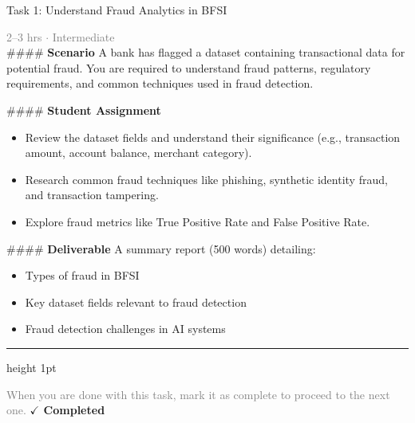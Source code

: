 \documentclass[10pt,a4paper]{article}
\begin{document}
\begin{taskbox}{Task 1: Understand Fraud Analytics in BFSI}

    {\small \textcolor{gray}{2--3 hrs $\cdot$ Intermediate}}\\[12pt]

    \#\#\#\# \textbf{Scenario}  
A bank has flagged a dataset containing transactional data for potential fraud. You are required to understand fraud patterns, regulatory requirements, and common techniques used in fraud detection.  

\#\#\#\# \textbf{Student Assignment}  
\begin{itemize}
    \item Review the dataset fields and understand their significance (e.g., transaction amount, account balance, merchant category).  
    \item Research common fraud techniques like phishing, synthetic identity fraud, and transaction tampering.  
    \item Explore fraud metrics like True Positive Rate and False Positive Rate.  
\end{itemize}

\#\#\#\# \textbf{Deliverable}  
A summary report (500 words) detailing:  
\begin{itemize}
    \item Types of fraud in BFSI  
    \item Key dataset fields relevant to fraud detection  
    \item Fraud detection challenges in AI systems\par
\end{itemize}

    \vspace{16pt}

    \textcolor{cardBorder}{\hrule height 1pt}\vspace{8pt}

    \small \textcolor{gray}{When you are done with this task, mark it as complete to proceed to the next one.} \hfill \textbf{\textcolor{brandDark}{$\checkmark$ Completed}}

\end{taskbox}
\end{document}
